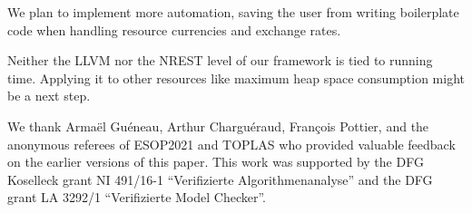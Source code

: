 \documentclass[acmsmall]{acmart}
\begin{document}
We plan to implement more automation, saving the user from writing boilerplate code when handling resource currencies and exchange rates.


Neither the LLVM nor the NREST level of our framework is 
tied to running time. 
Applying it to other resources like maximum heap space consumption might be a next step.




\begin{acks}
We thank Arma{\"{e}}l Gu{\'{e}}neau, Arthur Chargu\'{e}raud, Fran{\c{c}}ois Pottier, and the anonymous referees of ESOP2021 and TOPLAS who provided valuable feedback on the earlier versions of this paper.
This work was supported by the DFG Koselleck grant NI 491/16-1 ``Verifizierte Algorithmenanalyse'' and the DFG grant LA 3292/1 ``Verifizierte Model Checker''.
%
\end{acks}



\end{document}
